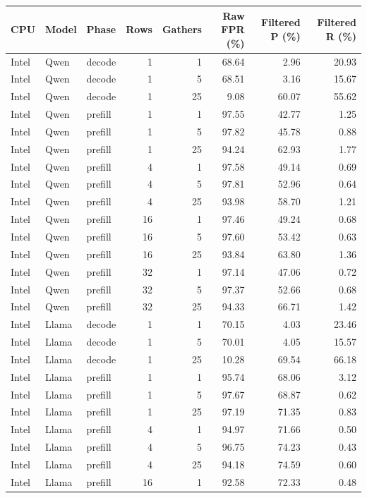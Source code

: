 \begin{tabular}{lllrrrrr}
\hline
CPU & Model & Phase & Rows & Gathers & Raw FPR (\%) & Filtered P (\%) & Filtered R (\%) \\
\hline
Intel & Qwen & decode & 1 & 1 & 68.64 & 2.96 & 20.93 \\
Intel & Qwen & decode & 1 & 5 & 68.51 & 3.16 & 15.67 \\
Intel & Qwen & decode & 1 & 25 & 9.08 & 60.07 & 55.62 \\
Intel & Qwen & prefill & 1 & 1 & 97.55 & 42.77 & 1.25 \\
Intel & Qwen & prefill & 1 & 5 & 97.82 & 45.78 & 0.88 \\
Intel & Qwen & prefill & 1 & 25 & 94.24 & 62.93 & 1.77 \\
Intel & Qwen & prefill & 4 & 1 & 97.58 & 49.14 & 0.69 \\
Intel & Qwen & prefill & 4 & 5 & 97.81 & 52.96 & 0.64 \\
Intel & Qwen & prefill & 4 & 25 & 93.98 & 58.70 & 1.21 \\
Intel & Qwen & prefill & 16 & 1 & 97.46 & 49.24 & 0.68 \\
Intel & Qwen & prefill & 16 & 5 & 97.60 & 53.42 & 0.63 \\
Intel & Qwen & prefill & 16 & 25 & 93.84 & 63.80 & 1.36 \\
Intel & Qwen & prefill & 32 & 1 & 97.14 & 47.06 & 0.72 \\
Intel & Qwen & prefill & 32 & 5 & 97.37 & 52.66 & 0.68 \\
Intel & Qwen & prefill & 32 & 25 & 94.33 & 66.71 & 1.42 \\
Intel & Llama & decode & 1 & 1 & 70.15 & 4.03 & 23.46 \\
Intel & Llama & decode & 1 & 5 & 70.01 & 4.05 & 15.57 \\
Intel & Llama & decode & 1 & 25 & 10.28 & 69.54 & 66.18 \\
Intel & Llama & prefill & 1 & 1 & 95.74 & 68.06 & 3.12 \\
Intel & Llama & prefill & 1 & 5 & 97.67 & 68.87 & 0.62 \\
Intel & Llama & prefill & 1 & 25 & 97.19 & 71.35 & 0.83 \\
Intel & Llama & prefill & 4 & 1 & 94.97 & 71.66 & 0.50 \\
Intel & Llama & prefill & 4 & 5 & 96.75 & 74.23 & 0.43 \\
Intel & Llama & prefill & 4 & 25 & 94.18 & 74.59 & 0.60 \\
Intel & Llama & prefill & 16 & 1 & 92.58 & 72.33 & 0.48 \\

\end{tabular}
